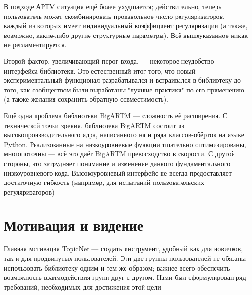 В подходе АРТМ ситуация ещё более ухудшается; действительно, теперь пользователь может скомбинировать произвольное число регуляризаторов, каждый из которых имеет индивидуальный коэффициент регуляризации (а также, возможно, какие-либо другие структурные параметры). Всё вышеуказанное никак не регламентируется.  

Второй фактор, увеличивающий порог входа, --- некоторое неудобство интерфейса библиотеки. Это естественный итог того, что новый экспериментальный функционал разрабатывался и встраивался в библиотеку до того, как сообществом были выработаны "лучшие практики" по его применению (а также желания сохранить обратную совместимость).  


Ещё одна проблема библиотеки BigARTM --- сложность её расширения. С технической точки зрения, библиотека BigARTM состоит из высокопроизводительного ядра, написанного на \cpp и ряда классов-обёрток на языке Python. Реализованные на \cpp низкоуровневые функции тщательно оптимизированы, многопоточны --- всё это даёт BigARTM превосходство в скорости. С другой стороны, это затрудняет понимание и изменение данного фундаментального низкоуровневого кода. Высокоуровневый интерфейс не всегда предоставляет достаточную гибкость (например, для испытаний пользовательских регуляризаторов) 

\section{Мотивация и видение} 

Главная мотивация TopicNet --- создать инструмент, удобный как для новичков, так и для продвинутых пользователей. Эти две группы пользователей не обязаны использовать библиотеку одним и тем же образом; важнее всего обеспечить возможность взаимодействия групп друг с другом. Нами был сформулирован ряд требований, необходимых для достижения этой цели: 

